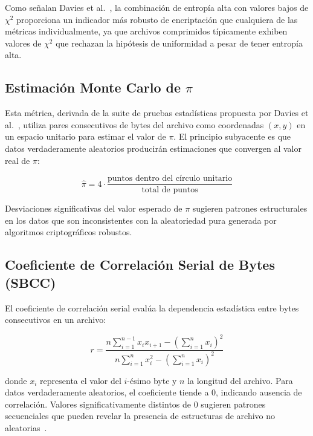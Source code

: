 Como señalan Davies et al.~\cite{paper_4_comparison_of_entropy}, la combinación de entropía alta con valores bajos de $\chi^2$ proporciona un indicador más robusto de encriptación que cualquiera de las métricas individualmente, ya que archivos comprimidos típicamente exhiben valores de $\chi^2$ que rechazan la hipótesis de uniformidad a pesar de tener entropía alta.

\subsection{Estimación Monte Carlo de \texorpdfstring{$\pi$}{pi}}

Esta métrica, derivada de la suite de pruebas estadísticas propuesta por Davies et al.~\cite{paper_4_comparison_of_entropy}, utiliza pares consecutivos de bytes del archivo como coordenadas $(x, y)$ en un espacio unitario para estimar el valor de $\pi$. El principio subyacente es que datos verdaderamente aleatorios producirán estimaciones que convergen al valor real de $\pi$:

\begin{equation}
    \hat{\pi} = 4 \cdot \frac{\text{puntos dentro del círculo unitario}}{\text{total de puntos}}
\end{equation}

Desviaciones significativas del valor esperado de $\pi$ sugieren patrones estructurales en los datos que son inconsistentes con la aleatoriedad pura generada por algoritmos criptográficos robustos.

\subsection{Coeficiente de Correlación Serial de Bytes (SBCC)}

El coeficiente de correlación serial evalúa la dependencia estadística entre bytes consecutivos en un archivo:

\begin{equation}
    r = \frac{n\sum_{i=1}^{n-1} x_i x_{i+1} - \left(\sum_{i=1}^{n} x_i\right)^2}{n\sum_{i=1}^{n} x_i^2 - \left(\sum_{i=1}^{n} x_i\right)^2}
\end{equation}

donde $x_i$ representa el valor del $i$-ésimo byte y $n$ la longitud del archivo. Para datos verdaderamente aleatorios, el coeficiente tiende a 0, indicando ausencia de correlación. Valores significativamente distintos de 0 sugieren patrones secuenciales que pueden revelar la presencia de estructuras de archivo no aleatorias~\cite{lee2022}.

